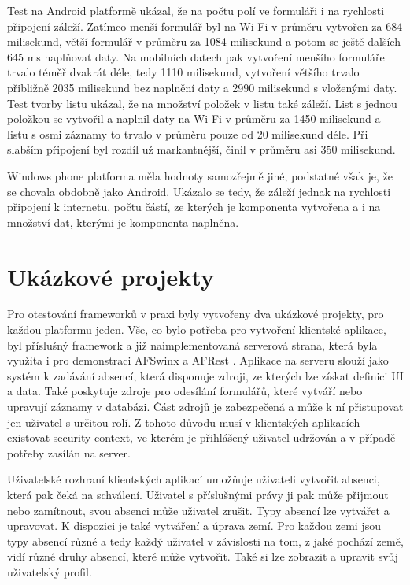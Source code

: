 Test na Android platformě ukázal, že na počtu polí ve formuláři i na rychlosti připojení záleží. Zatímco menší formulář byl na Wi-Fi v průměru vytvořen za 684 milisekund, větší formulář v průměru za 1084 milisekund a potom se ještě dalších 645 ms naplňovat daty. Na mobilních datech pak vytvoření menšího formuláře trvalo téměř dvakrát déle, tedy 1110 milisekund, vytvoření většího trvalo přibližně 2035 milisekund bez naplnění daty a 2990 milisekund s vloženými daty. Test tvorby listu ukázal, že na množství položek v listu také záleží. List s jednou položkou se vytvořil a naplnil daty na Wi-Fi v průměru za 1450 milisekund a listu s osmi záznamy to trvalo v průměru pouze od 20 milisekund déle. Při slabším připojení byl rozdíl už markantnější, činil v průměru asi 350 milisekund.

Windows phone platforma měla hodnoty samozřejmě jiné, podstatné však je, že se chovala obdobně jako Android. Ukázalo se tedy, že záleží jednak na rychlosti připojení k internetu, počtu částí, ze kterých je komponenta vytvořena a i na množství dat, kterými je komponenta naplněna.

\section{Ukázkové projekty}
Pro otestování frameworků v praxi byly vytvořeny dva ukázkové projekty, pro každou platformu jeden. Vše, co bylo potřeba pro vytvoření klientské aplikace, byl příslušný framework a již naimplementovaná serverová strana, která byla využita i pro demonstraci AFSwinx a AFRest \cite{tomasek-thesis}. Aplikace na serveru slouží jako systém k zadávání absencí, která disponuje zdroji, ze kterých lze získat definici UI a data. Také poskytuje zdroje pro odesílání formulářů, které vytváří nebo upravují záznamy v databázi. Část zdrojů je zabezpečená a může k ní přistupovat jen uživatel s určitou rolí. Z tohoto důvodu musí v klientských aplikacích existovat security context, ve kterém je přihlášený uživatel udržován a v případě potřeby zasílán na server. 

Uživatelské rozhraní klientských aplikací umožňuje uživateli vytvořit absenci, která pak čeká na schválení. Uživatel s příslušnými právy ji pak může přijmout nebo zamítnout, svou absenci může uživatel zrušit. Typy absencí lze vytvářet a upravovat. K dispozici je také vytváření a úprava zemí. Pro každou zemi jsou typy absencí různé a tedy každý uživatel v závislosti na tom, z jaké pochází země, vidí různé druhy absencí, které může vytvořit. Také si lze zobrazit a upravit svůj uživatelský profil.

